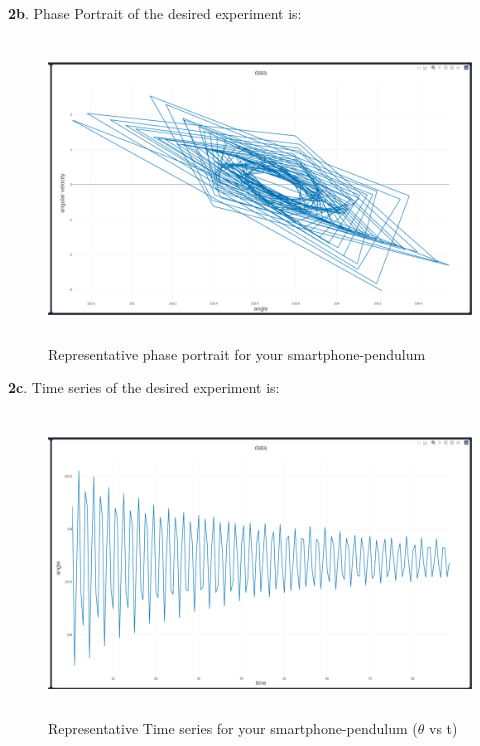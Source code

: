 \documentclass[11pt]{scrartcl} %
\begin{document}
\newpage
\textbf{2b}.
Phase Portrait of the desired experiment is:
\begin{figure}[h] %
	\centering
	\includegraphics[width=12cm, height=8cm]{Figures/M 2b.png} %
	\caption {Representative phase portrait for your smartphone-pendulum}
\end{figure}

\textbf{2c}.
Time series of the desired experiment is:
\begin{figure}[h] %
	\centering
	\includegraphics[width=12cm, height=8cm]{Figures/M 2c.png} %
	\caption {Representative Time series for your smartphone-pendulum ($\theta$ vs t)}
\end{figure}
\end{document}
